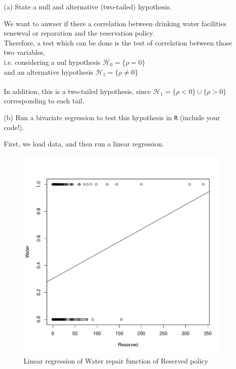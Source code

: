 \documentclass[12pt,letterpaper]{article}
\begin{document}
\newpage
\begin{enumerate}
	\item [(a)] State a null and alternative (two-tailed) hypothesis. 
	
	We want to anwser if there a correlation between drinking water facilities renewval or reparation and the reservation policy.
	\\ Therefore, a test which can be done is the test of correlation between those two variables, \\
	i.e. considering a nul hypothesis $\mathcal{H}_0 = \{ \rho = 0 \}$ \\
	and an alternative hypothesis $\mathcal{H}_1 = \{ \rho \neq 0 \}$\\
	\\
	In addition, this is a two-tailed hypothesis, since  $\mathcal{H}_1 = \{ \rho < 0 \} \cup \{ \rho > 0 \} $ corresponding to each tail.
		
	\item [(b)] Run a bivariate regression to test this hypothesis in \texttt{R} (include your code!).
	
	First, we load data, and then run a linear regression.
	  
	
	\begin{figure}[h!]\centering
		\caption{\footnotesize Linear regression of Water repair function of Reserved policy }
		\label{fig:plot_2}
		\includegraphics[width=.85\textwidth]{lm.pdf}
	\end{figure}


\end{enumerate}
\end{document}
